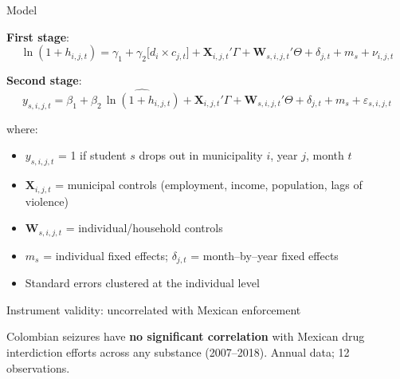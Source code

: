 \documentclass[aspectratio=169]{beamer}
\begin{document}
\begin{frame}{Model}

\textbf{First stage}:
\small
\begin{equation*}
    \ln(1 + h_{i,j,t}) = \gamma_1 + \gamma_2 \bigl[ d_i \times c_{j,t} \bigr] + \mathbf{X}_{i,j,t}'\Gamma + \mathbf{W}_{s,i,j,t}'\Theta + \delta_{j,t} + m_s + \nu_{i,j,t}
\end{equation*}

\normalsize
\vspace{0.4cm}
\pause

\textbf{Second stage}:
\small
\begin{equation*}
    y_{s,i,j,t} = \beta_1 + \beta_2\,\widehat{\ln(1 + h_{i,j,t})} + \mathbf{X}_{i,j,t}'\Gamma + \mathbf{W}_{s,i,j,t}'\Theta + \delta_{j,t} + m_s + \varepsilon_{s,i,j,t}
\end{equation*}

\normalsize
\vspace{0.4cm}

where:
\begin{itemize}
    \item $y_{s,i,j,t}$ = 1 if student $s$ drops out in municipality $i$, year $j$, month $t$
    \item $\mathbf{X}_{i,j,t}$ = municipal controls (employment, income, population, lags of violence)
    \item $\mathbf{W}_{s,i,j,t}$ = individual/household controls
    \item $m_s$ = individual fixed effects; $\delta_{j,t}$ = month--by--year fixed effects
    \item Standard errors clustered at the individual level
\end{itemize}

\end{frame}


\begin{frame}{Instrument validity: uncorrelated with Mexican enforcement}

\begin{center}
\scalebox{0.72}{%
\begin{threeparttable}

\end{threeparttable}
}
\end{center}
\vspace{0.3em}
{\footnotesize Colombian seizures have \textbf{no significant correlation} with Mexican drug interdiction efforts across any substance (2007--2018). Annual data; 12 observations.}

\end{frame}
\end{document}
